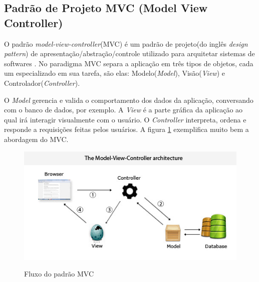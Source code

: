 \subsection{Padrão de Projeto MVC (Model View Controller)}
\label{subsec:thresholding}

O padrão \textit{model-view-controller}(MVC) é um padrão de projeto(do inglês \textit{design pattern}) de apresentação/abstração/controle utilizado para arquitetar sistemas de softwares \cite{leff2001webmvc}. No paradigma MVC separa a aplicação em três tipos de objetos, cada um especializado em sua tarefa, são elas: Modelo(\textit{Model}), Visão(\textit{View}) e Controlador(\textit{Controller}). \par
O \textit{Model} gerencia e valida o comportamento dos dados da aplicação, conversando com o banco de dados, por exemplo. A \textit{View} é a parte gráfica da aplicação ao qual irá interagir visualmente com o usuário. O \textit{Controller} interpreta, ordena e responde a requisições feitas pelos usuários.\cite{burbeck1997applications} A figura \ref{fig:mvc} exemplifica muito bem a abordagem do MVC. \par

\begin{figure}[htbp!]
  \centering
  \caption{Fluxo do padrão MVC}
  \includegraphics[width=1\textwidth]{figs/mvc.jpg}
    \label{fig:mvc}
\end{figure}


